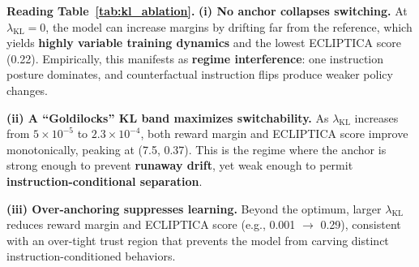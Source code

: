 \begin{table}[ht!]
\centering
\normalsize
\renewcommand{\arraystretch}{1.2}
\caption{\textbf{Effect of KL weight on stability and switchability.} Optimal performance occurs in a narrow band $\lambda_{\text{KL}}\approx 2\times 10^{-4}$--$3\times 10^{-4}$, where preference separation is strong while instruction regimes remain co-located.}
\label{tab:kl_ablation}
\end{table}

\vspace{-0.35em}
\noindent\textbf{Reading Table~\ref{tab:kl_ablation}.}
\textbf{(i) No anchor collapses switching.}
At $\lambda_{\text{KL}}=0$, the model can increase margins by drifting far from the reference, which yields \textbf{highly variable training dynamics} and the lowest ECLIPTICA score (0.22).
Empirically, this manifests as \textbf{regime interference}: one instruction posture dominates, and counterfactual instruction flips produce weaker policy changes.

\vspace{-0.25em}
\noindent
\textbf{(ii) A ``Goldilocks'' KL band maximizes switchability.}
As $\lambda_{\text{KL}}$ increases from $5\times 10^{-5}$ to $2.3\times 10^{-4}$, both reward margin and ECLIPTICA score improve monotonically, peaking at (7.5, 0.37).
This is the regime where the anchor is strong enough to prevent \textbf{runaway drift}, yet weak enough to permit \textbf{instruction-conditional separation}.

\vspace{-0.25em}
\noindent
\textbf{(iii) Over-anchoring suppresses learning.}
Beyond the optimum, larger $\lambda_{\text{KL}}$ reduces reward margin and ECLIPTICA score (e.g., 0.001 $\rightarrow$ 0.29), consistent with an over-tight trust region that prevents the model from carving distinct instruction-conditioned behaviors.

